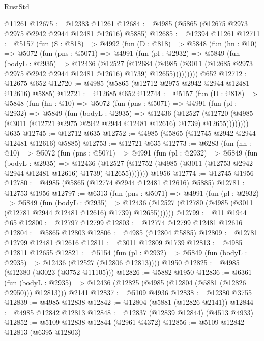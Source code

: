 \begin{lexlean}{RustStd}
\begin{coremodule}
    @11261
@12675 := @12383 @11261
@12684 := @4985 (@5865 (@12675 @2973 @2975 @2942 @2944 @12481 @12616) @5885)
@12685 := @12394 @11261
@12711 := @5157
    (fun (S : @818) =>
    @4992
      (fun (D : @818) =>
      @5848
        (fun (hn : @10) =>
        @5072
          (fun (pns : @5071) =>
          @4991
            (fun (pl : @2932) =>
            @5849
              (fun (bodyL : @2935) =>
              @12436
                (@12527
                  (@12684
                    (@4985
                      (@3011 (@12685 @2973 @2975 @2942 @2944 @12481 @12616) @1739)
                      @12655)))))))))
    @652
@12712 := @12675 @652
@12720 := @4985 (@5865 (@12712 @2975 @2942 @2944 @12481 @12616) @5885)
@12721 := @12685 @652
@12744 := @5157
    (fun (D : @818) =>
    @5848
      (fun (hn : @10) =>
      @5072
        (fun (pns : @5071) =>
        @4991
          (fun (pl : @2932) =>
          @5849
            (fun (bodyL : @2935) =>
            @12436
              (@12527
                (@12720 (@4985 (@3011 (@12721 @2975 @2942 @2944 @12481 @12616) @1739) @12655))))))))
    @635
@12745 := @12712 @635
@12752 := @4985 (@5865 (@12745 @2942 @2944 @12481 @12616) @5885)
@12753 := @12721 @635
@12773 := @6283
    (fun (hn : @10) =>
    @5072
      (fun (pns : @5071) =>
      @4991
        (fun (pl : @2932) =>
        @5849
          (fun (bodyL : @2935) =>
          @12436
            (@12527 (@12752 (@4985 (@3011 (@12753 @2942 @2944 @12481 @12616) @1739) @12655)))))))
    @1956
@12774 := @12745 @1956
@12780 := @4985 (@5865 (@12774 @2944 @12481 @12616) @5885)
@12781 := @12753 @1956
@12797 := @6313
    (fun (pns : @5071) =>
    @4991
      (fun (pl : @2932) =>
      @5849
        (fun (bodyL : @2935) =>
        @12436 (@12527 (@12780 (@4985 (@3011 (@12781 @2944 @12481 @12616) @1739) @12655))))))
@12799 := @11 @1944 @65
@12800 := @12797 @12799
@12803 := @12774 @12799 @12481 @12616
@12804 := @5865 @12803
@12806 := @4985 (@12804 @5885)
@12809 := @12781 @12799 @12481 @12616
@12811 := @3011 @12809 @1739
@12813 := @4985 @12811 @12655
@12821 := @5154
    (fun (pl : @2932) => @5849 (fun (bodyL : @2935) => @12436 (@12527 (@12806 @12813))))
    @1950
@12825 := @4985 (@12380 (@3023 (@3752 @11105)))
@12826 := @5882 @1950
@12836 := @6361
    (fun (bodyL : @2935) => @12436 (@12825 (@4985 (@12804 (@5881 (@12826 @2950))) @12813)))
    @2141
@12837 := @5109 @4936
@12838 := @12380 @3755
@12839 := @4985 @12838
@12842 := @12804 (@5881 (@12826 @2141))
@12844 := @4985 @12842 @12813
@12848 := @12837 (@12839 @12844) (@4513 @4933)
@12852 := @5109 @12838 @12844 (@2961 @4372)
@12856 := @5109 @12842 @12813 (@6395 @12803)

\end{coremodule}
\end{lexlean}
